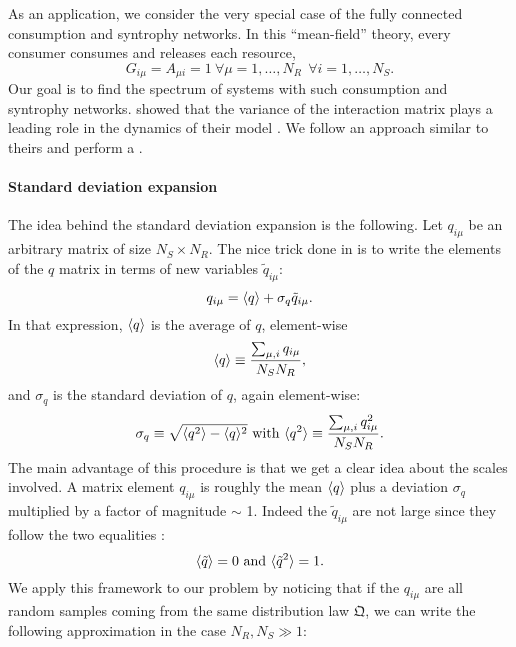 \documentclass[12pt, titlepage]{report}
\begin{document}
As an application, we consider the very special case of the fully connected consumption and syntrophy networks. In this ``mean-field'' theory, every consumer consumes and releases each resource, \ie
\begin{equation}
G_{i\mu}=A_{\mu i}=1 \ \forall \mu=1, \dots, N_R \ \ \forall i=1, \dots, N_S.
\end{equation}
Our goal is to find the spectrum of systems with such consumption and syntrophy networks.
\citeauthor{barbier_cavity_2017} showed that the variance of the interaction matrix plays a leading role in the dynamics of their model \cite{barbier_cavity_2017}. We follow an approach similar to theirs and perform a .
\paragraph{Standard deviation expansion}
The idea behind the standard deviation expansion is the following. Let $q_{i\mu}$ be an arbitrary matrix of size $N_S \times N_R$. The nice trick done in \cite{barbier_cavity_2017} is to write the elements of the $q$ matrix in terms of new variables $\tilde{q}_{i\mu}$:
\begin{equation}
q_{i\mu} = \langle q \rangle + \sigma_q \tilde{q}_{i\mu}. \label{eq : separation matrix average standard dev}
\end{equation}
In that expression, $\langle q \rangle$ is the average of $q$, element-wise
\begin{equation}
\langle q \rangle\equiv \frac{\sum_{\mu,i} q_{i\mu}}{N_S N_R},
\end{equation}
and $\sigma_q$ is the standard deviation of $q$, again element-wise:
\begin{equation}
\sigma_q \equiv \sqrt{\langle q^2 \rangle-\langle q \rangle^2} \text{ with } \langle q^2 \rangle\equiv \frac{\sum_{\mu,i} q_{i\mu}^2}{N_S N_R}.
\end{equation}
The main advantage of this procedure is that we get a clear idea about the scales involved. A matrix element $q_{i\mu}$ is roughly the mean $\langle q \rangle$ plus a deviation $\sigma_q$ multiplied by a factor of magnitude $\sim$ 1. Indeed the $\tilde{q}_{i\mu}$ are not large since they follow the two equalities \cite{barbier_cavity_2017}:
\begin{equation}
\langle \tilde{q} \rangle = 0 \text{ and } \langle \tilde{q}^2 \rangle = 1.
\end{equation}
We apply this framework to our problem by noticing that if the $q_{i\mu}$ are all random samples coming from the same distribution law $\mathfrak{Q}$, we can write the following approximation in the case $N_R, N_S \gg 1 $:
\end{document}
